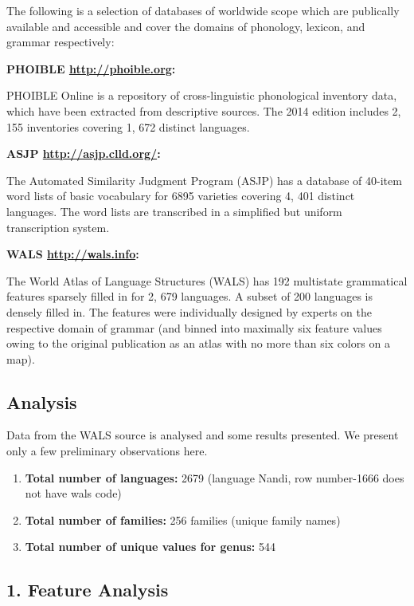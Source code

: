 The following is a selection of databases of worldwide scope which are publically available and accessible and cover the domains of phonology, lexicon, and grammar respectively:

\textbf{PHOIBLE \url{http://phoible.org}:}

PHOIBLE Online is a repository of cross-linguistic phonological inventory data, which have been extracted from descriptive sources. The 2014 edition includes 2, 155 inventories covering 1, 672 distinct languages.

\textbf{ASJP \url{http://asjp.clld.org/}:}

The Automated Similarity Judgment Program (ASJP) has a database of 40-item word lists of basic vocabulary for 6895 varieties covering 4, 401 distinct languages. The word lists are transcribed in a simplified but uniform transcription system.

\textbf{WALS \url{http://wals.info}:}

The World Atlas of Language Structures (WALS) has 192 multistate grammatical features sparsely filled in for 2, 679 languages. A subset of 200 languages is densely filled in. The features were individually designed by experts on the respective domain of grammar (and binned into maximally six feature values owing to the original publication as an atlas with no more than six colors on a map).


\subsection*{Analysis}

Data from the WALS source is analysed and some results presented. We present only a few preliminary observations here.

\begin{enumerate}[{\rm 1)}]
\itemsep=0pt
\item \textbf{Total number of languages:} 2679 (language Nandi, row number-1666 does not have wals code)

 \item \textbf{Total number of families:} 256 families (unique family names)

 \item \textbf{Total number of unique values for genus:} 544

\end{enumerate}


\subsection*{1. Feature Analysis}

